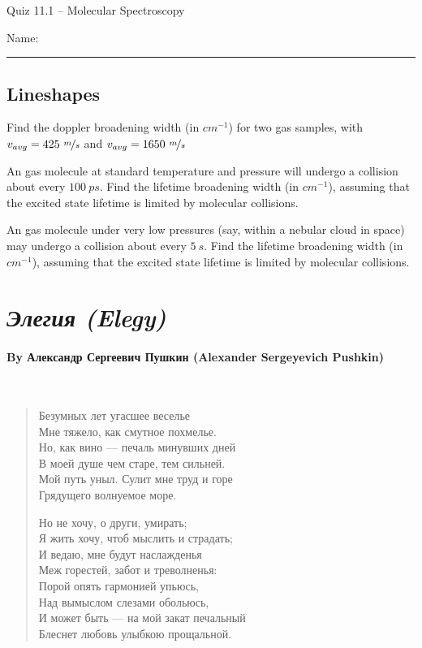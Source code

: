 \documentclass[11pt, letterpaper]{memoir}
\begin{document}
\begin{center}
	{\large Quiz 11.1 -- Molecular Spectroscopy}
\end{center}
{\large Name: \rule[-1mm]{4in}{.1pt}

\subsection*{Lineshapes}
Find the doppler broadening width (in $cm^{-1}$) for two gas samples, with $v_{avg}=425~\nicefrac{m}{s}$ and $v_{avg}=1650~\nicefrac{m}{s}$

\vspace{10em}\noindent
An  gas molecule at standard temperature and pressure will undergo a collision about every $100~ps$. Find the lifetime broadening width (in $cm^{-1}$), assuming that the excited state lifetime is limited by molecular collisions.

\vspace{10em}\noindent
An  gas molecule under very low pressures (say, within a nebular cloud in space) may undergo a collision about every $5~s$. Find the lifetime broadening width (in $cm^{-1}$), assuming that the excited state lifetime is limited by molecular collisions.

\newpage
\pagestyle{empty}
\addtocounter{page}{-1}
\section*{\emph{Элегия (Elegy)}}
\paragraph{By Александр Сергеевич Пушкин (Alexander Sergeyevich Pushkin)}~
\begin{verse}
	Безумных лет угасшее веселье\\
	Мне тяжело, как смутное похмелье.\\
	Но, как вино — печаль минувших дней\\
	В моей душе чем старе, тем сильней.\\
	Мой путь уныл. Сулит мне труд и горе\\
	Грядущего волнуемое море.

	Но не хочу, о други, умирать;\\
	Я жить хочу, чтоб мыслить и страдать;\\
	И ведаю, мне будут наслажденья\\
	Меж горестей, забот и треволненья:\\
	Порой опять гармонией упьюсь,\\
	Над вымыслом слезами обольюсь,\\
	И может быть — на мой закат печальный\\
	Блеснет любовь улыбкою прощальной.
\end{verse}

}
\end{document}

